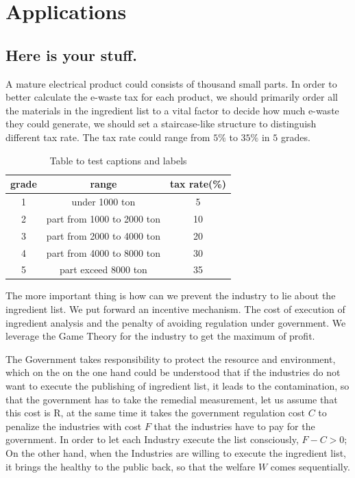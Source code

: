 \section{Applications}

\subsection{Here is your stuff.}

A mature electrical product could consists of thousand small parts. In order to better 
calculate the e-waste tax for each product, we should primarily order all the materials 
in the ingredient list to a vital factor to decide how much e-waste they could generate, 
we should set a  staircase-like structure to distinguish different tax rate. 
The tax rate could range from $5\%$ to $35\%$ in $5$ grades. 

\begin{center}
\begin{table}
\begin{tabular}{ccc}
	\toprule
	grade	& range 					& tax rate(\%)\\
	\midrule
	1		& under 1000 ton 			& 5 \\
	2		& part from 1000 to 2000 ton & 10 \\
	3		& part from 2000 to 4000 ton & 20 \\
	4		& part from 4000 to 8000 ton & 30 \\
	5		& part exceed 8000 ton & 35 \\
	\bottomrule
\end{tabular}
\caption{Table to test captions and labels}
\label{table:1}
\end{table}
\end{center}

The more important thing is how can we prevent the industry to lie about the ingredient list. 
We put forward an incentive mechanism. The cost of execution of ingredient analysis and the penalty 
of avoiding regulation under government. We leverage the Game Theory for the industry to get the maximum of profit.

The Government takes responsibility to protect the resource and environment, 
which on the on the one hand could be understood that if the industries do not want to 
execute the publishing of ingredient list, it leads to the contamination, 
so that the government has to take the remedial measurement, let us assume that this cost is R, 
at the same time it takes the government regulation cost $C$ to penalize the
industries with cost $F$ that the industries have to pay for the government. 
In order to let each Industry execute the list consciously, $F-C >0$; On the other hand, 
when the Industries are willing to execute the ingredient list, it brings the healthy to 
the public back, so that the welfare $W$ comes sequentially.

